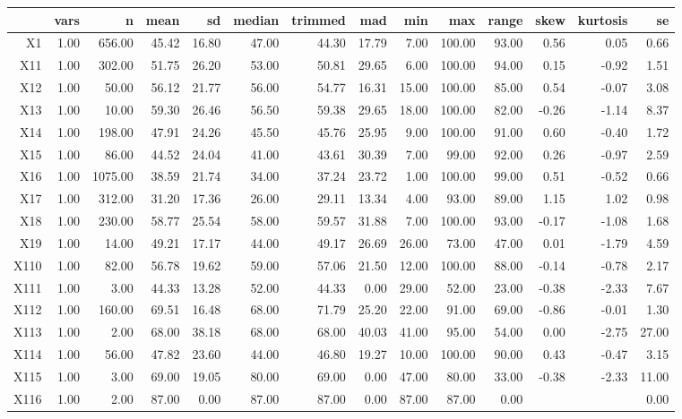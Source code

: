 % 
\begin{tabular}{rrrrrrrrrrrrrr}
  \hline
 & vars & n & mean & sd & median & trimmed & mad & min & max & range & skew & kurtosis & se \\ 
  \hline
X1 & 1.00 & 656.00 & 45.42 & 16.80 & 47.00 & 44.30 & 17.79 & 7.00 & 100.00 & 93.00 & 0.56 & 0.05 & 0.66 \\ 
  X11 & 1.00 & 302.00 & 51.75 & 26.20 & 53.00 & 50.81 & 29.65 & 6.00 & 100.00 & 94.00 & 0.15 & -0.92 & 1.51 \\ 
  X12 & 1.00 & 50.00 & 56.12 & 21.77 & 56.00 & 54.77 & 16.31 & 15.00 & 100.00 & 85.00 & 0.54 & -0.07 & 3.08 \\ 
  X13 & 1.00 & 10.00 & 59.30 & 26.46 & 56.50 & 59.38 & 29.65 & 18.00 & 100.00 & 82.00 & -0.26 & -1.14 & 8.37 \\ 
  X14 & 1.00 & 198.00 & 47.91 & 24.26 & 45.50 & 45.76 & 25.95 & 9.00 & 100.00 & 91.00 & 0.60 & -0.40 & 1.72 \\ 
  X15 & 1.00 & 86.00 & 44.52 & 24.04 & 41.00 & 43.61 & 30.39 & 7.00 & 99.00 & 92.00 & 0.26 & -0.97 & 2.59 \\ 
  X16 & 1.00 & 1075.00 & 38.59 & 21.74 & 34.00 & 37.24 & 23.72 & 1.00 & 100.00 & 99.00 & 0.51 & -0.52 & 0.66 \\ 
  X17 & 1.00 & 312.00 & 31.20 & 17.36 & 26.00 & 29.11 & 13.34 & 4.00 & 93.00 & 89.00 & 1.15 & 1.02 & 0.98 \\ 
  X18 & 1.00 & 230.00 & 58.77 & 25.54 & 58.00 & 59.57 & 31.88 & 7.00 & 100.00 & 93.00 & -0.17 & -1.08 & 1.68 \\ 
  X19 & 1.00 & 14.00 & 49.21 & 17.17 & 44.00 & 49.17 & 26.69 & 26.00 & 73.00 & 47.00 & 0.01 & -1.79 & 4.59 \\ 
  X110 & 1.00 & 82.00 & 56.78 & 19.62 & 59.00 & 57.06 & 21.50 & 12.00 & 100.00 & 88.00 & -0.14 & -0.78 & 2.17 \\ 
  X111 & 1.00 & 3.00 & 44.33 & 13.28 & 52.00 & 44.33 & 0.00 & 29.00 & 52.00 & 23.00 & -0.38 & -2.33 & 7.67 \\ 
  X112 & 1.00 & 160.00 & 69.51 & 16.48 & 68.00 & 71.79 & 25.20 & 22.00 & 91.00 & 69.00 & -0.86 & -0.01 & 1.30 \\ 
  X113 & 1.00 & 2.00 & 68.00 & 38.18 & 68.00 & 68.00 & 40.03 & 41.00 & 95.00 & 54.00 & 0.00 & -2.75 & 27.00 \\ 
  X114 & 1.00 & 56.00 & 47.82 & 23.60 & 44.00 & 46.80 & 19.27 & 10.00 & 100.00 & 90.00 & 0.43 & -0.47 & 3.15 \\ 
  X115 & 1.00 & 3.00 & 69.00 & 19.05 & 80.00 & 69.00 & 0.00 & 47.00 & 80.00 & 33.00 & -0.38 & -2.33 & 11.00 \\ 
  X116 & 1.00 & 2.00 & 87.00 & 0.00 & 87.00 & 87.00 & 0.00 & 87.00 & 87.00 & 0.00 &  &  & 0.00 \\ 
   \hline
\end{tabular}

